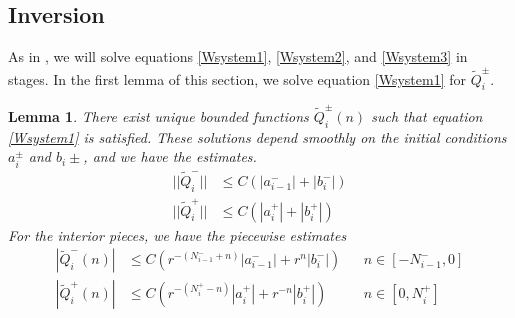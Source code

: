 \documentclass[12pt]{article}
\newtheorem{lemma}{Lemma}
\begin{document}
\subsection{Inversion}

As in \cite{Sandstede1997}, we will solve equations \eqref{Wsystem1}, \eqref{Wsystem2}, and \eqref{Wsystem3} in stages. In the first lemma of this section, we solve equation \eqref{Wsystem1} for $\tilde{Q}_i^\pm$. 

\begin{lemma}\label{inv1}
There exist unique bounded functions $\tilde{Q}_i^\pm(n)$ such that equation \eqref{Wsystem1} is satisfied. These solutions depend smoothly on the initial conditions $a_i^\pm$ and $b_i\pm$, and we have the estimates.
\begin{equation}\label{Wipmest}
\begin{aligned}
||\tilde{Q}_i^-|| &\leq C (|a_{i-1}^-| + |b_i^-|) \\
||\tilde{Q}_i^+|| &\leq C (|a_i^+| + |b_i^+| )
\end{aligned}
\end{equation}
For the interior pieces, we have the piecewise estimates
\begin{equation}\label{Wipiecewise}
\begin{aligned}
|\tilde{Q}_i^-(n)| &\leq C (r^{-(N_{i-1}^- + n)}|a_{i-1}^-| + r^n|b_i^-|) && n \in [-N_{i-1}^-, 0] \\
|\tilde{Q}_i^+(n)| &\leq C (r^{-(N_i^+ - n)}|a_i^+| + r^{-n}|b_i^+| ) && n \in [0, N_i^+] 
\end{aligned}
\end{equation}


\end{lemma}
\end{document}
